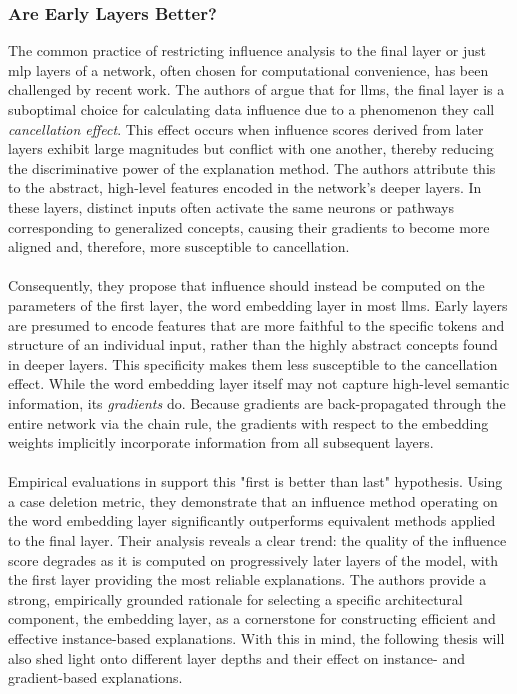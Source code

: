 \subsubsection{Are Early Layers Better?}
The common practice of restricting influence analysis to the final layer \cite{DBLP:conf/aaai/SchioppaZVS22, DBLP:conf/emnlp/AkyurekBLXTAG22} or just \acrshort{mlp} layers \cite{DBLP:journals/corr/abs-2308-03296} of a network, often chosen for computational convenience, has been challenged by recent work. The authors of \cite{DBLP:conf/nips/YehTSLR22} argue that for \acrshort{llm}s, the final layer is a suboptimal choice for calculating data influence due to a phenomenon they call \textit{cancellation effect}. This effect occurs when influence scores derived from later layers exhibit large magnitudes but conflict with one another, thereby reducing the discriminative power of the explanation method. The authors attribute this to the abstract, high-level features encoded in the network's deeper layers. In these layers, distinct inputs often activate the same neurons or pathways corresponding to generalized concepts, causing their gradients to become more aligned and, therefore, more susceptible to cancellation.
\\\\
Consequently, they propose that influence should instead be computed on the parameters of the first layer, the word embedding layer in most \acrshort{llm}s. Early layers are presumed to encode features that are more faithful to the specific tokens and structure of an individual input, rather than the highly abstract concepts found in deeper layers. This specificity makes them less susceptible to the cancellation effect. While the word embedding layer itself may not capture high-level semantic information, its \emph{gradients} do. Because gradients are back-propagated through the entire network via the chain rule, the gradients with respect to the embedding weights implicitly incorporate information from all subsequent layers.
\\\\
Empirical evaluations in \cite{DBLP:conf/nips/YehTSLR22} support this "first is better than last" hypothesis. Using a case deletion metric, they demonstrate that an influence method operating on the word embedding layer significantly outperforms equivalent methods applied to the final layer. Their analysis reveals a clear trend: the quality of the influence score degrades as it is computed on progressively later layers of the model, with the first layer providing the most reliable explanations. The authors provide a strong, empirically grounded rationale for selecting a specific architectural component, the embedding layer, as a cornerstone for constructing efficient and effective instance-based explanations. With this in mind, the following thesis will also shed light onto different layer depths and their effect on instance- and gradient-based explanations.